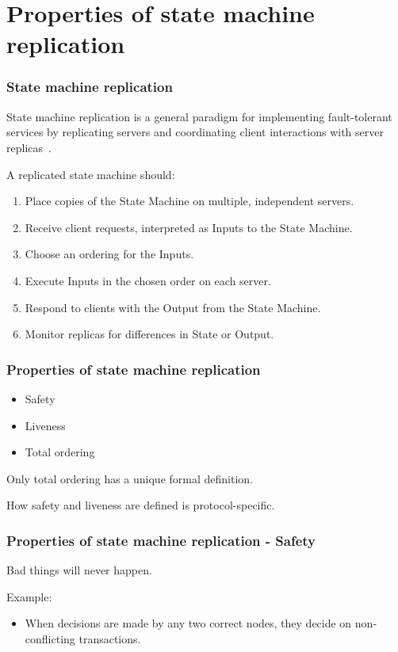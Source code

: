 \documentclass{beamer}
\begin{document}


\section{Properties of state machine replication}


\begin{frame}
\frametitle{State machine replication}

State machine replication is a general paradigm for implementing fault-tolerant services by replicating servers and coordinating client interactions with server replicas~\cite{schneider1990implementing}.

A replicated state machine should:

\begin{enumerate}
    \item Place copies of the State Machine on multiple, independent servers.
    \item Receive client requests, interpreted as Inputs to the State Machine.
    \item Choose an ordering for the Inputs.
    \item Execute Inputs in the chosen order on each server.
    \item Respond to clients with the Output from the State Machine.
    \item Monitor replicas for differences in State or Output.
\end{enumerate}




\end{frame}

\begin{frame}
\frametitle{Properties of state machine replication}

\begin{itemize}
    \item Safety
    \item Liveness
    \item Total ordering
\end{itemize}

Only total ordering has a unique formal definition.

How safety and liveness are defined is protocol-specific.

\end{frame}

\begin{frame}
\frametitle{Properties of state machine replication - Safety}

Bad things will never happen.

Example: 
\begin{itemize}
    \item When decisions are made by any two correct nodes, they decide on non-conflicting transactions.
\end{itemize}

\end{frame}
\end{document}
